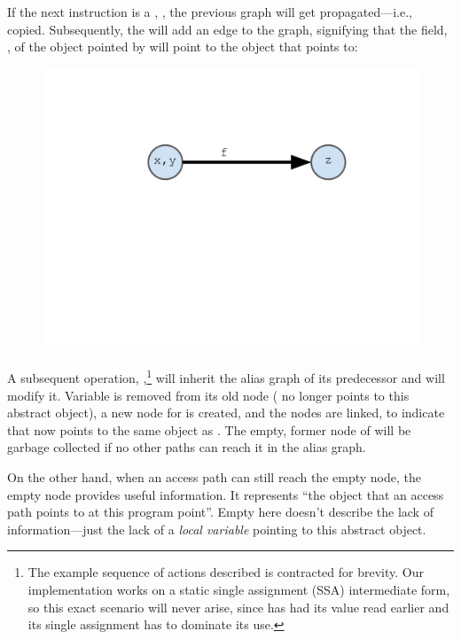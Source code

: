 If the next instruction is a , , the previous graph will get propagated---i.e., copied. Subsequently, the  will add an edge to the graph, signifying that the field, , of the object pointed by  will point to the object that  points to:

\begin{figure}[ht]
\centering
\includegraphics[trim={35mm 115mm 35mm 51mm},clip,width=0.8\linewidth]{assets/must-data/alias-graph2.pdf}
\end{figure}

A subsequent  operation, ,\footnote{The example sequence of actions described is contracted for brevity. Our implementation works on a static single assignment (SSA) intermediate form, so this exact scenario will never arise, since  has had its value read earlier and its single assignment has to dominate its use.} will inherit the alias graph of its predecessor and will modify it. Variable  is removed from its old node ( no longer points to this abstract object), a new node for  is created, and the nodes are linked, to indicate that  now points to the same object as . The empty, former node of  will be garbage collected if no other paths can reach it in the alias graph.

On the other hand, when an access path can still reach the empty node, the empty node provides useful information. It represents ``the object that an access path points to at this program point''. Empty here doesn't describe the lack of information---just the lack of a \emph{local variable} pointing to this abstract object.

